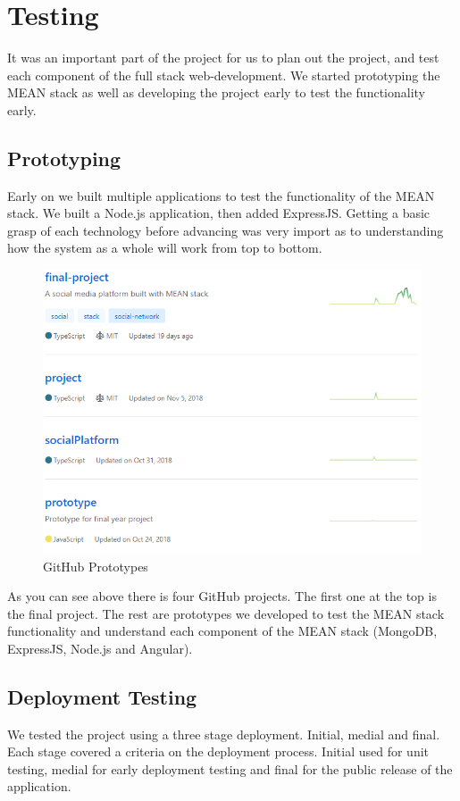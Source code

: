 \section{Testing}
It was an important part of the project for us to plan out the project, and test each component of the full stack web-development. We started prototyping the MEAN stack as well as developing the project early to test the functionality early.

\subsection{Prototyping}
Early on we built multiple applications to test the functionality of the MEAN stack. We built a Node.js application, then added ExpressJS. Getting a basic grasp of each technology before advancing was very import as to understanding how the system as a whole will work from top to bottom.

\begin{figure}[H]
  \includegraphics[width=\linewidth]{img/prototypes.PNG}
  \caption{GitHub Prototypes}
  \label{fig:GHP}
\end{figure}

As you can see above there is four GitHub projects. The first one at the top is the final project. The rest are prototypes we developed to test the MEAN stack functionality and understand each component of the MEAN stack (MongoDB, ExpressJS, Node.js and Angular).

\subsection{Deployment Testing}
We tested the project using a three stage deployment. Initial, medial and final. Each stage covered a criteria on the deployment process. Initial used for unit testing, medial for early deployment testing and final for the public release of the application.

